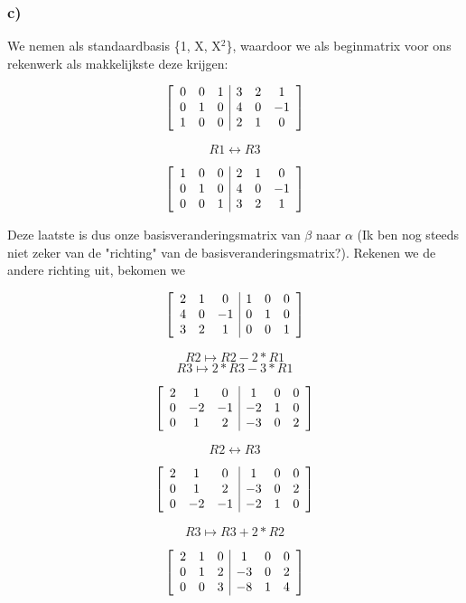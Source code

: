 \documentclass[lineaire_algebra_oplossingen.tex]{subfiles}
\begin{document}
\subsubsection*{c)}
We nemen als standaardbasis \{1, X, X$^2$\}, waardoor we als beginmatrix voor ons rekenwerk als makkelijkste deze krijgen:

\[
\left[
\begin{array}{ c c c | c c c }
0 & 0 & 1 & 3 & 2 & 1\\
0 & 1 & 0 & 4 & 0 & -1\\
1 & 0 & 0 & 2 & 1 & 0
\end{array}
\right]
\]

\[R1 \leftrightarrow R3 \]

\[
\left[
\begin{array}{ c c c | c c c }
1 & 0 & 0 & 2 & 1 & 0\\
0 & 1 & 0 & 4 & 0 & -1\\
0 & 0 & 1 & 3 & 2 & 1
\end{array}
\right]
\]

Deze laatste is dus onze basisveranderingsmatrix van $\beta$ naar $\alpha$ (Ik ben nog steeds niet zeker van de "richting" van de basisveranderingsmatrix?). Rekenen we de andere richting uit, bekomen we

\[
\left[
\begin{array}{ c c c | c c c }
2 & 1 & 0 & 1 & 0 & 0\\
4 & 0 & -1 & 0 & 1 & 0\\
3 & 2 & 1 & 0 & 0 & 1
\end{array}
\right]
\]

\[R2 \mapsto R2 - 2*R1 \]
\[R3 \mapsto 2*R3 - 3*R1 \]

\[
\left[
\begin{array}{ c c c | c c c }
2 & 1 & 0 & 1 & 0 & 0\\
0 & -2 & -1 & -2 & 1 & 0\\
0 & 1 & 2 & -3 & 0 & 2
\end{array}
\right]
\]

\[R2 \leftrightarrow R3 \]

\[
\left[
\begin{array}{ c c c | c c c }
2 & 1 & 0 & 1 & 0 & 0\\
0 & 1 & 2 & -3 & 0 & 2\\
0 & -2 & -1 & -2 & 1 & 0
\end{array}
\right]
\]

\[R3 \mapsto R3 + 2*R2 \]

\[
\left[
\begin{array}{ c c c | c c c }
2 & 1 & 0 & 1 & 0 & 0\\
0 & 1 & 2 & -3 & 0 & 2\\
0 & 0 & 3 & -8 & 1 & 4
\end{array}
\right]
\]
\end{document}
